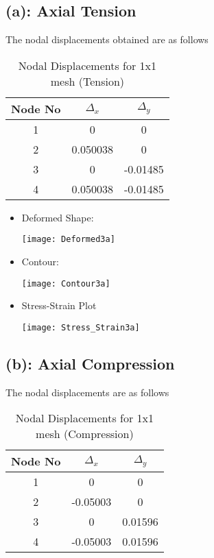 \subsection*{(a): Axial Tension}
The nodal displacements obtained are as follows
\begin{table}[htbp]
  \centering
  \caption{Nodal Displacements for 1x1 mesh (Tension)}
    \begin{tabular}{ccc}
    \toprule
    Node No & $\Delta_x$ & $\Delta_y$ \\
    \midrule
    1     & 0     & 0 \\
    2     & 0.050038 & 0 \\
    3     & 0     & -0.01485 \\
    4     & 0.050038 & -0.01485 \\
    \bottomrule
    \end{tabular}%
  \label{Displacements}%
\end{table}
\begin{itemize}
\item Deformed Shape:
\begin{center}
\texttt{[image: Deformed3a]}
\end{center}
\newpage \item Contour: 
\begin{center}
\texttt{[image: Contour3a]}
\end{center}
\item Stress-Strain Plot
\begin{center}
\texttt{[image: Stress\_Strain3a]}
\end{center}
\end{itemize}
\newpage \subsection*{(b): Axial Compression}
The nodal displacements are as follows
\begin{table}[htbp]
  \centering
  \caption{Nodal Displacements for 1x1 mesh (Compression)}
    \begin{tabular}{ccc}
    \toprule
    {Node No} & {$\Delta_x$} & {$\Delta_y$} \\
    \midrule
    1     & 0     & 0 \\
    2     & -0.05003 & 0 \\
    3     & 0     & 0.01596 \\
    4     & -0.05003 & 0.01596 \\
    \bottomrule
    \end{tabular}%
  \label{Displacementscomp}%
\end{table}%
